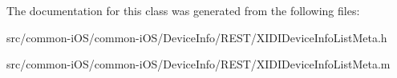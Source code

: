 The documentation for this class was generated from the following files\+:\begin{DoxyCompactItemize}
\item 
src/common-\/i\+O\+S/common-\/i\+O\+S/\+Device\+Info/\+R\+E\+S\+T/X\+I\+D\+I\+Device\+Info\+List\+Meta.\+h\item 
src/common-\/i\+O\+S/common-\/i\+O\+S/\+Device\+Info/\+R\+E\+S\+T/X\+I\+D\+I\+Device\+Info\+List\+Meta.\+m\end{DoxyCompactItemize}
